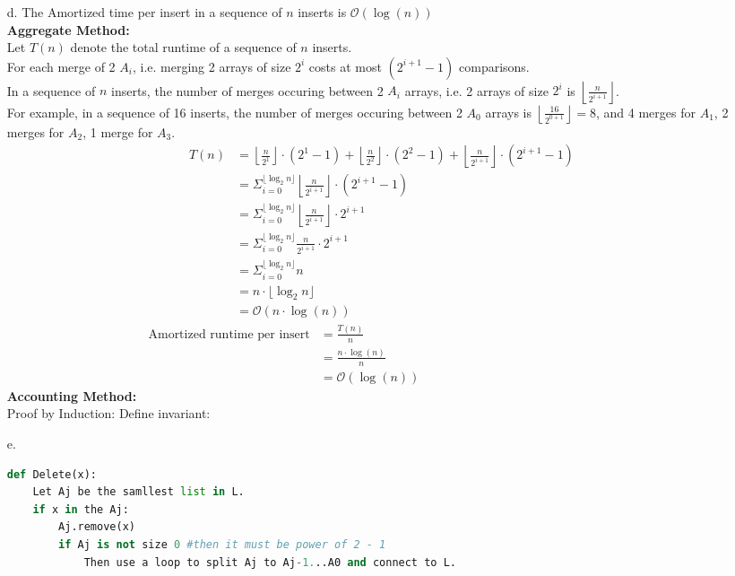 \documentclass[10pt]{article}
\begin{document}
\begin{itemize}
\item[d.]The Amortized time per insert in a sequence of $n$ inserts is $\mathcal{O}(\log(n))$\\
\textbf{Aggregate Method:}\\
Let $T(n)$ denote the total runtime of a sequence of $n$ inserts.\\
For each merge of 2 $A_i$, i.e. merging 2 arrays of size $2^i$ costs at most $(2^{i+1}-1)$ comparisons.\\
In a sequence of $n$ inserts, the number of merges occuring between 2 $A_i$ arrays, i.e. 2 arrays of size $2^i$ is $\left\lfloor\frac{n}{2^{i+1}}\right\rfloor$.\\
For example, in a sequence of 16 inserts, the number of merges occuring between 2 $A_0$ arrays is $\left\lfloor\frac{16}{2^{0+1}}\right\rfloor = 8$, and 4 merges for $A_1$, 2 merges for $A_2$, 1 merge for $A_3$.
\begin{align*}
T(n) &= \left\lfloor\frac{n}{2^1}\right\rfloor\cdot(2^1-1)+\left\lfloor\frac{n}{2^2}\right\rfloor\cdot(2^2-1)+\left\lfloor\frac{n}{2^{i+1}}\right\rfloor\cdot(2^{i+1}-1)\\
&=\Sigma^{\lfloor\log_2n\rfloor}_{i=0}\left\lfloor\frac{n}{2^{i+1}}\right\rfloor\cdot(2^{i+1}-1)\\
&=\Sigma^{\lfloor\log_2n\rfloor}_{i=0}\left\lfloor\frac{n}{2^{i+1}}\right\rfloor\cdot2^{i+1}\\
&=\Sigma^{\lfloor\log_2n\rfloor}_{i=0}\frac{n}{2^{i+1}}\cdot2^{i+1}\\
&=\Sigma^{\lfloor\log_2n\rfloor}_{i=0}n\\
&=n\cdot\lfloor\log_2n\rfloor\\
&=\mathcal{O}(n\cdot\log(n))
\end{align*}
\begin{align*}
\text{Amortized runtime per insert}&=\frac{T(n)}{n}\hspace{20em}\\
&=\frac{n\cdot\log(n)}{n}\\
&=\mathcal{O}(\log(n))
\end{align*}
\textbf{Accounting Method:}\\
Proof by Induction:
Define invariant: \\
\item[e.]
\begin{lstlisting}[language=Python]
def Delete(x):
	Let Aj be the samllest list in L.
	if x in the Aj:
		Aj.remove(x)
		if Aj is not size 0 #then it must be power of 2 - 1
			Then use a loop to split Aj to Aj-1...A0 and connect to L.

\end{lstlisting}
\end{itemize}
\end{document}
